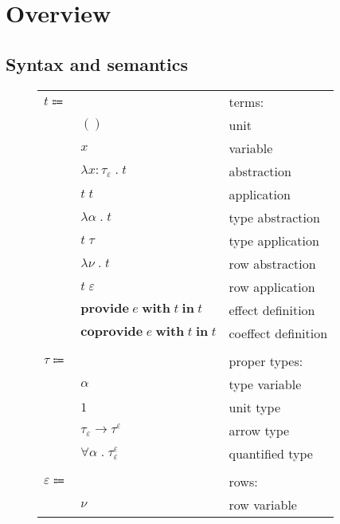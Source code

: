 \documentclass[12pt]{article}
\newcommand\anno[2]{#1 : #2}
\newcommand\term{t}
\newcommand\eunit{()}
\newcommand\evar{x}
\newcommand\eabs[2]{\lambda #1 \; . \; #2}
\newcommand\eapp[2]{#1 \; #2}
\newcommand\etabs[2]{\lambda #1 \; . \; #2}
\newcommand\etapp[2]{#1 \; #2}
\newcommand\eprovide[3]{\textbf{provide} \; #1 \; \textbf{with} \; #2 \; \textbf{in} \; #3}
\newcommand\ecoprovide[3]{\textbf{coprovide} \; #1 \; \textbf{with} \; #2 \; \textbf{in} \; #3}
\newcommand\tembellished[3]{{#1}^{#2}_{#3}}
\newcommand\proper{\tau}
\newcommand\tvar{\alpha}
\newcommand\tunit{1}
\newcommand\tarrow[2]{#1 \rightarrow #2}
\newcommand\tforall[2]{\forall #1 \; . \; #2}
\newcommand\row{\varepsilon}
\newcommand\rvar{\nu}
\newcommand\effect{e}
\begin{document}
  \section{Overview}

    \subsection{Syntax and semantics}

      \begin{figure}[H]
        \begin{mdframed}[backgroundcolor=none]
          \begin{center}
            \begin{tabular}{l l l}
              $\term \Coloneqq $ & & terms: \\
              & $\eunit$ & unit \\
              & $\evar$ & variable \\
              & $\eabs{\anno{\evar}{\tembellished{\proper}{}{\row}}}{\term}$ & abstraction \\
              & $\eapp{\term}{\term}$ & application \\
              & $\etabs{\tvar}{\term}$ & type abstraction \\
              & $\etapp{\term}{\proper}$ & type application \\
              & $\etabs{\rvar}{\term}$ & row abstraction \\
              & $\etapp{\term}{\row}$ & row application \\
              & $\eprovide{\effect}{\term}{\term}$ & effect definition \\
              & $\ecoprovide{\effect}{\term}{\term}$ & coeffect definition \\
              \\
              $\proper \Coloneqq$ & & proper types: \\
              & $\tvar$ & type variable \\
              & $\tunit$ & unit type \\
              & $\tarrow{\tembellished{\proper}{}{\row}}{\tembellished{\proper}{\row}{}}$ & arrow type \\
              & $\tforall{\tvar}{\tembellished{\proper}{\row}{\row}}$ & quantified type \\
              \\
              $\row \Coloneqq$ & & rows: \\
              & $\rvar$ & row variable \\

\end{tabular}
\end{center}
\end{mdframed}
\end{figure}
\end{document}

